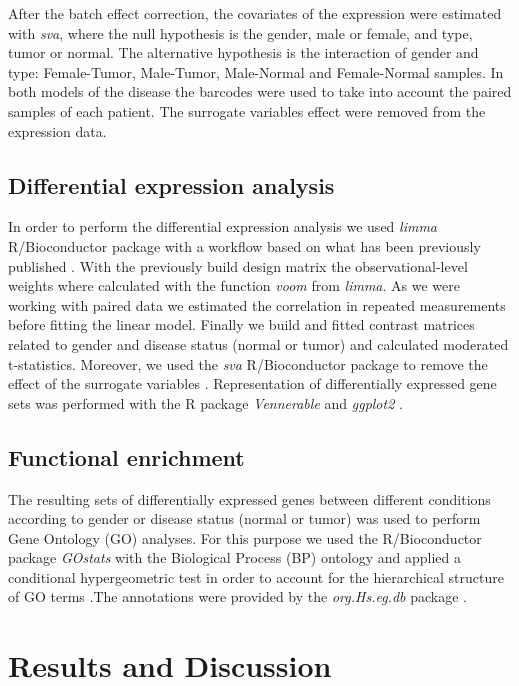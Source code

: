 \documentclass[9pt,twocolumn,twoside]{gsajnl}
\begin{document}
After the batch effect correction, the covariates of the expression were estimated with \textit{sva}, where the null hypothesis is the gender, male or female, and type, tumor or normal. The alternative hypothesis is the interaction of gender and type: Female-Tumor, Male-Tumor, Male-Normal and Female-Normal samples. In both models of the disease the barcodes were used to take into account the paired samples of each patient. The surrogate variables effect were removed from the expression data.

\subsection*{Differential expression analysis}
In order to perform the differential expression analysis we used \textit{limma} R/Bioconductor package with a workflow based on what has been previously published \citep{limma}. With the previously build design matrix the observational-level weights where calculated with the function \textit{voom} from \textit{limma}. As we were working with paired data we estimated the correlation in repeated measurements before fitting the linear model. Finally we build and fitted contrast matrices related to gender and disease status (normal or tumor) and calculated moderated t-statistics. Moreover, we used the \textit{sva} R/Bioconductor package to remove the effect of the surrogate variables \citep{sva}. Representation of differentially expressed gene sets was performed with the R package \textit{Vennerable} \citep{Venn} and \textit{ggplot2} \citep{ggplot2}.

\subsection*{Functional enrichment}
The resulting sets of differentially expressed genes between different conditions according to gender or disease status (normal or tumor) was used to perform Gene Ontology (GO) analyses. For this purpose we used the R/Bioconductor package \textit{GOstats} with the Biological Process (BP) ontology and applied a conditional hypergeometric test in order to account for the hierarchical structure of GO terms \citep{Gostats}.The annotations were provided by the \textit{org.Hs.eg.db} package \citep{org}. 


\section*{Results and Discussion}
\end{document}
